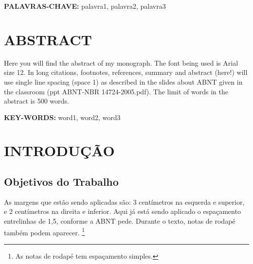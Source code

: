 \documentclass[12pt,a4paper]{article}
\begin{document}
	\vspace{0.8cm}
	\textbf{PALAVRAS-CHAVE:} palavra1, palavra2, palavra3

\onehalfspacing

\clearpage %
\thispagestyle{empty} %
\section*{\hfil ABSTRACT} %
	\singlespace
	Here you will find the abstract of my monograph.
	The font being used is Arial size 12.
	In long citations, footnotes, references, summary and abstract (here!) will use single line spacing (space 1) as described in the slides about ABNT given in the classroom (ppt ABNT-NBR 14724-2005.pdf).
	The limit of words in the abstract is 500 words.
	
	\vspace{0.8cm}
	\textbf{KEY-WORDS:} word1, word2, word3

\onehalfspacing

\clearpage %
\thispagestyle{empty} %
\listoffigures %

\clearpage %
\thispagestyle{empty} %
\listoftables %

\clearpage %
\thispagestyle{empty} %
\tableofcontents %

\clearpage %
\section{INTRODUÇÃO}

	\subsection{Objetivos do Trabalho}
	As margens que estão sendo aplicadas são: 3 centímetros na esquerda e superior, e 2 centímetros na direita e inferior.
	Aqui já está sendo aplicado o espaçamento entrelinhas de 1,5, conforme a ABNT pede.
	Durante o texto, notas de rodapé também podem aparecer.
	\footnote{As notas de rodapé tem espaçamento simples.}
	
\end{document}

